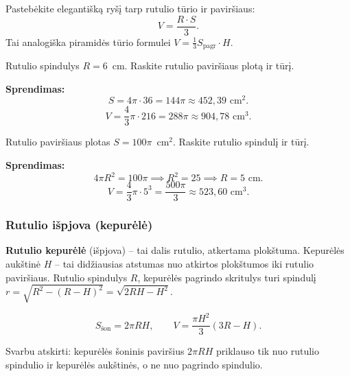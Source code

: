\begin{remark}
Pastebėkite elegantišką ryšį tarp rutulio tūrio ir paviršiaus:
\[
V = \frac{R \cdot S}{3}.
\]
Tai analogiška piramidės tūrio formulei $V = \frac{1}{3}S_{\text{pagr}} \cdot H$.
\end{remark}

\begin{example}
Rutulio spindulys $R = 6$~cm. Raskite rutulio paviršiaus plotą ir tūrį.

\textbf{Sprendimas:}
\[
S = 4\pi \cdot 36 = 144\pi \approx 452{,}39 \text{ cm}^2.
\]
\[
V = \frac{4}{3}\pi \cdot 216 = 288\pi \approx 904{,}78 \text{ cm}^3.
\]
\end{example}

\begin{example}
Rutulio paviršiaus plotas $S = 100\pi$~cm$^2$. Raskite rutulio spindulį ir tūrį.

\textbf{Sprendimas:}
\[
4\pi R^2 = 100\pi \implies R^2 = 25 \implies R = 5 \text{ cm}.
\]
\[
V = \frac{4}{3}\pi \cdot 5^3 = \frac{500\pi}{3} \approx 523{,}60 \text{ cm}^3.
\]
\end{example}

\subsubsection*{Rutulio išpjova (kepurėlė)}

\begin{definition}
\textbf{Rutulio kepurėlė} (išpjova) -- tai dalis rutulio, atkertama plokštuma. Kepurėlės aukštinė $H$ -- tai didžiausias atstumas nuo atkirtos plokštumos iki rutulio paviršiaus. Rutulio spindulys $R$, kepurėlės pagrindo skritulys turi spindulį $r = \sqrt{R^2 - (R-H)^2} = \sqrt{2RH - H^2}$.
\end{definition}

\begin{theorem}
\[
S_{\text{šon}} = 2\pi R H, \qquad V = \frac{\pi H^2}{3}(3R - H).
\]
\end{theorem}

\begin{remark}
Svarbu atskirti: kepurėlės šoninis paviršius $2\pi RH$ priklauso tik nuo rutulio spindulio ir kepurėlės aukštinės, o ne nuo pagrindo spindulio.
\end{remark}

